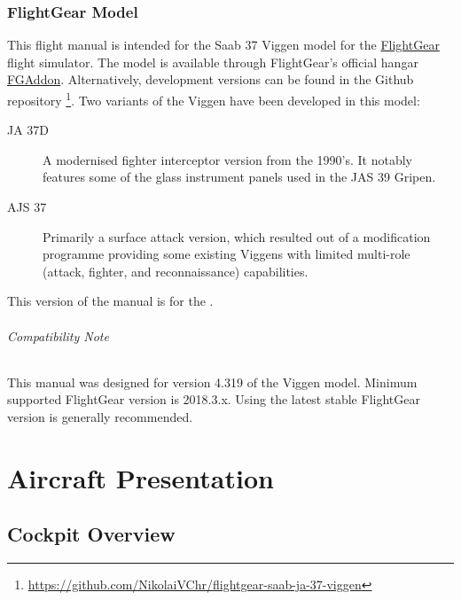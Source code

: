 \documentclass[a4paper]{report}
\newcommand{\variant}{\ifbool{AJS}{AJS 37}{JA 37D}}
\newcommand{\versionnumber}{4.319}
\begin{document}
\section*{FlightGear Model}
This flight manual is intended for the Saab 37 Viggen model
for the \href{http://www.flightgear.org}{FlightGear} flight simulator.
The model is available through FlightGear's official hangar
\href{http://wiki.flightgear.org/FGAddon}{FGAddon}.
Alternatively, development versions can be found in the Github repository%
\footnote{\url{https://github.com/NikolaiVChr/flightgear-saab-ja-37-viggen}}.
Two variants of the Viggen have been developed in this model:
\begin{description}
  \item[JA 37D] A modernised fighter interceptor version from the 1990's.
    It notably features some of the glass instrument panels used in the JAS 39 Gripen.
  \item[AJS 37] Primarily a surface attack version,
    which resulted out of a modification programme providing some existing Viggens
    with limited multi-role (attack, fighter, and reconnaissance) capabilities.
\end{description}
This version of the manual is for the \variant{}.

\paragraph*{Compatibility Note}
This manual was designed for version \versionnumber{} of the Viggen model.
Minimum supported FlightGear version is 2018.3.x.
Using the latest stable FlightGear version is generally recommended.


\part{Aircraft Presentation}
\chapter{Cockpit Overview}
\end{document}
